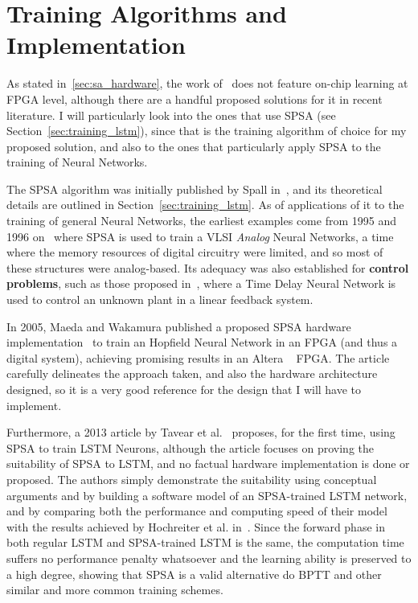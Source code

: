 \section{Training Algorithms and Implementation}\label{sec:sa_training}
As stated in~\ref{sec:sa_hardware}, the work of~\cite{Chang15} does not feature on-chip learning at FPGA level, although there are a handful proposed solutions for it in recent literature. I will particularly look into the ones that use SPSA (see Section~\ref{sec:training_lstm}), since that is the training algorithm of choice for my proposed solution, and also to the ones that particularly apply SPSA to the training of Neural Networks. 

The SPSA algorithm was initially published by Spall in~\cite{Spall98}, and its theoretical details are outlined in Section~\ref{sec:training_lstm}. As of applications of it to the training of general Neural Networks, the earliest examples come from 1995 and 1996 on~\cite{Maeda95, Cauwen96} where SPSA is used to train a VLSI \emph{Analog} Neural Networks, a time where the memory resources of digital circuitry were limited, and so most of these structures were analog-based. Its adequacy was also established for \textbf{control problems}, such as those proposed in~\cite{Figueiredo97}, where a Time Delay Neural Network is used to control an unknown plant in a linear feedback system.

In 2005, Maeda and Wakamura published a proposed SPSA hardware implementation~\cite{Maeda05} to train an Hopfield Neural Network in an FPGA (and thus a digital system), achieving promising results in an Altera \textregistered~ FPGA. The article carefully delineates the approach taken, and also the hardware architecture designed, so it is a very good reference for the design that I will have to implement. 

Furthermore, a 2013 article by Tavear et al.~\cite{Tavear13} proposes, for the first time, using SPSA to train LSTM Neurons, although the article focuses on proving the suitability of SPSA to LSTM, and no factual hardware implementation is done or proposed. The authors simply demonstrate the suitability using conceptual arguments and by building a software model of an SPSA-trained LSTM network, and by comparing both the performance and computing speed of their model with the results achieved by Hochreiter et al. in~\cite{Hochreiter07}. Since the forward phase in both regular LSTM and SPSA-trained LSTM is the same, the computation time suffers no performance penalty whatsoever and the learning ability is preserved to a high degree, showing that SPSA is a valid alternative do BPTT and other similar and more common training schemes.


